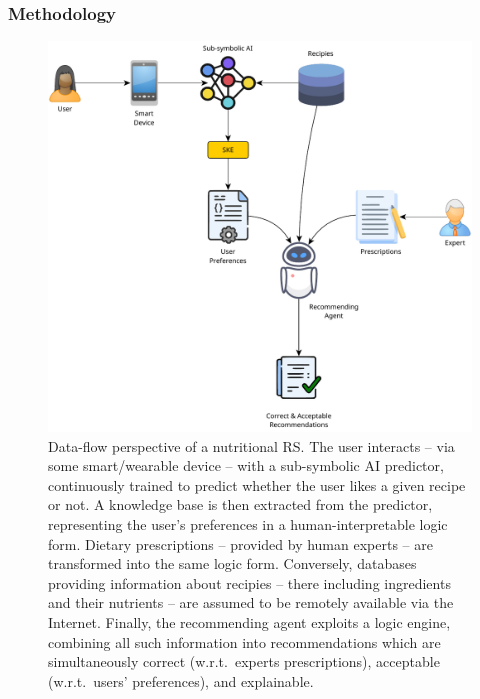 \subsubsection{Methodology}\label{subsubsec:methodology}
%
\begin{figure}
  \centering
  \includegraphics[width=\textwidth]{figures/ske-recommender-workflow}
  \caption{
    Data-flow perspective of a nutritional \gls{RS}.
    The user interacts -- via some smart/wearable device -- with a sub-symbolic AI predictor, continuously trained to predict whether the user likes a given recipe or not.
    A knowledge base is then extracted from the predictor, representing the user's preferences in a human-interpretable logic form.
    Dietary prescriptions -- provided by human experts -- are transformed into the same logic form.
    Conversely, databases providing information about recipies -- there including ingredients and their nutrients -- are assumed to be remotely available via the Internet.
    Finally, the recommending agent exploits a logic engine, combining all such information into recommendations which are simultaneously correct (w.r.t.\ experts prescriptions), acceptable (w.r.t.\ users' preferences), and explainable.
  }
  \label{fig:ske-recommender-workflow}
\end{figure}

